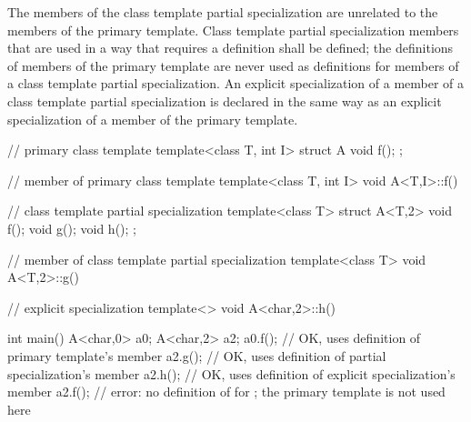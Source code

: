 \pnum
The members of the class template partial specialization are
unrelated to the members of the primary template.
Class template partial specialization members that are used in a way that
requires a definition shall be defined; the definitions of members of the
primary template are never used as definitions for members of a class
template partial specialization.
An explicit specialization of a member of a class template partial
specialization is declared in the same way as an explicit specialization of
a member of the primary template.
\begin{example}
\begin{codeblock}
// primary class template
template<class T, int I> struct A {
  void f();
};

// member of primary class template
template<class T, int I> void A<T,I>::f() { }

// class template partial specialization
template<class T> struct A<T,2> {
  void f();
  void g();
  void h();
};

// member of class template partial specialization
template<class T> void A<T,2>::g() { }

// explicit specialization
template<> void A<char,2>::h() { }

int main() {
  A<char,0> a0;
  A<char,2> a2;
  a0.f();           // OK, uses definition of primary template's member
  a2.g();           // OK, uses definition of partial specialization's member
  a2.h();           // OK, uses definition of explicit specialization's member
  a2.f();           // error: no definition of  for ; the primary template is not used here
}
\end{codeblock}
\end{example}

